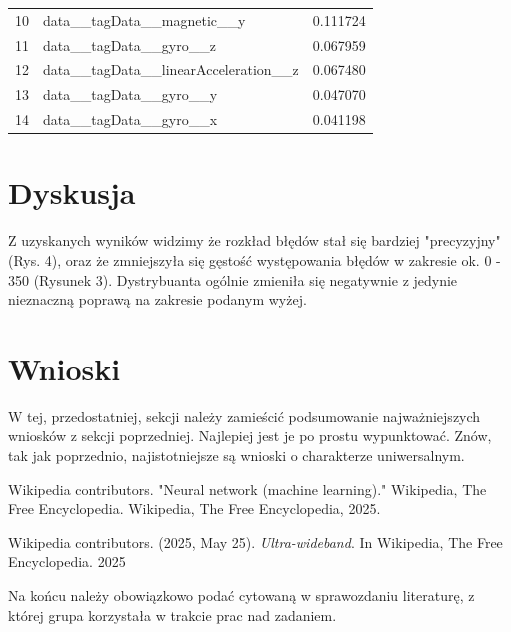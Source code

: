 \documentclass{classrep}
\begin{document}
{\begin{table}[ht]
\begin{tabular}{|c|l|r|}
		  10          & data\_\_tagData\_\_magnetic\_\_y           & 0.111724      \\
		  11          & data\_\_tagData\_\_gyro\_\_z               & 0.067959      \\
		  12          & data\_\_tagData\_\_linearAcceleration\_\_z & 0.067480      \\
		  13          & data\_\_tagData\_\_gyro\_\_y               & 0.047070      \\
		  14          & data\_\_tagData\_\_gyro\_\_x               & 0.041198      \\
		  \hline
	  \end{tabular}
	  \label{tab:nn_weights}
  \end{table}
 }
\clearpage{}

\section{Dyskusja}
Z uzyskanych wyników widzimy że rozkład błędów stał się bardziej "precyzyjny" (Rys. 4),
oraz że zmniejszyła się gęstość występowania błędów w zakresie ok. 0 - 350 (Rysunek 3).
Dystrybuanta ogólnie zmieniła się negatywnie z jedynie nieznaczną poprawą na zakresie podanym wyżej.

\section{Wnioski}
 {\color{blue}
  W tej, przedostatniej, sekcji należy zamieścić podsumowanie najważniejszych
  wniosków z sekcji poprzedniej. Najlepiej jest je po prostu wypunktować. Znów,
  tak jak poprzednio, najistotniejsze są wnioski o charakterze uniwersalnym.}

\begin{thebibliography}{0}
	 Wikipedia contributors. "Neural network (machine learning)."
	Wikipedia, The Free Encyclopedia. Wikipedia, The Free Encyclopedia,
	2025.

	 Wikipedia contributors. (2025, May 25). \textit{Ultra-wideband}.
	In Wikipedia, The Free Encyclopedia. 2025

\end{thebibliography}

{\color{blue}
Na końcu należy obowiązkowo podać cytowaną w sprawozdaniu literaturę, z której
grupa korzystała w trakcie prac nad zadaniem.}
\end{document}
